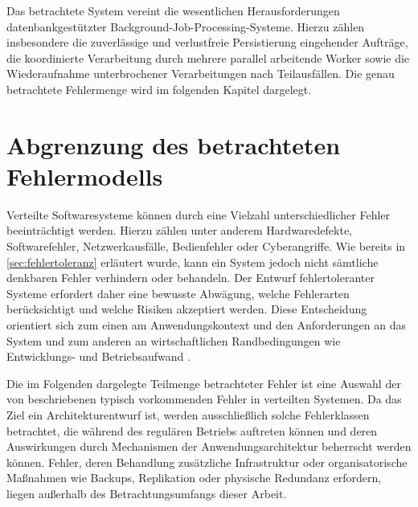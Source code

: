 Das betrachtete System vereint die wesentlichen Herausforderungen datenbankgestützter Background-Job-Processing-Systeme.
Hierzu zählen insbesondere die zuverlässige und verlustfreie Persistierung eingehender Aufträge, die koordinierte Verarbeitung durch
mehrere parallel arbeitende Worker sowie die Wiederaufnahme unterbrochener Verarbeitungen nach Teilausfällen.
Die genau betrachtete Fehlermenge wird im folgenden Kapitel dargelegt.

\section{Abgrenzung des betrachteten Fehlermodells}
\label{sec:abgrenzungFehlermodell}
Verteilte Softwaresysteme können durch eine Vielzahl unterschiedlicher Fehler beeinträchtigt werden.
Hierzu zählen unter anderem Hardwaredefekte, Softwarefehler, Netzwerkausfälle, Bedienfehler oder Cyberangriffe.
Wie bereits in \cref{sec:fehlertoleranz} erläutert wurde, kann ein System jedoch nicht sämtliche denkbaren Fehler verhindern oder behandeln.
Der Entwurf fehlertoleranter Systeme erfordert daher eine bewusste Abwägung, welche Fehlerarten berücksichtigt und welche Risiken akzeptiert werden.
Diese Entscheidung orientiert sich zum einen am Anwendungskontext und den Anforderungen an das System und zum anderen an wirtschaftlichen Randbedingungen
wie Entwicklungs- und Betriebsaufwand \parencite[Kap.~1 Abschnitt \glqq Reliability\grqq]{kleppmann_designing_2017}.

Die im Folgenden dargelegte Teilmenge betrachteter Fehler ist eine Auswahl der von
\textcite{kleppmann_designing_2017,newman_building_2026,bass_software_2021} beschriebenen typisch vorkommenden Fehler in verteilten Systemen.
Da das Ziel ein Architekturentwurf ist, werden ausschließlich solche Fehlerklassen betrachtet, die während des regulären Betriebs
auftreten können und deren Auswirkungen durch Mechanismen der Anwendungsarchitektur beherrscht werden können.
Fehler, deren Behandlung zusätzliche Infrastruktur oder organisatorische Maßnahmen wie Backups, Replikation oder physische Redundanz erfordern,
liegen außerhalb des Betrachtungsumfangs dieser Arbeit.

